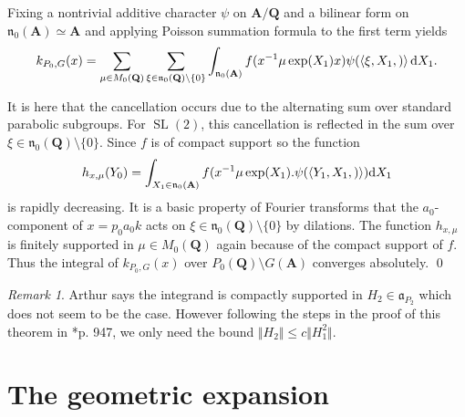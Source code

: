 \documentclass[11pt]{amsart}
\def\A{\mathbf A}
\def\Q{\mathbf Q}
\def\aaa{\mathfrak a}
\def\d{\text d}
\def\bs{\setminus}
\def\norm#1{\Vert #1 \Vert} %
\def\nnn{\mathfrak n}
\def\sl{\operatorname{SL}}
\def\sprod#1#2{\left\langle #1 , #2 \right\rangle}  %
\theoremstyle{remark}
\newtheorem{remark}[theorem]{Remark}
\begin{document}
Fixing a nontrivial additive character $\psi$ on $\A/\Q$ and a bilinear form on $\nnn_0(\A) \simeq \A$ and applying Poisson summation formula to the first term yields
\[ k_{P_0, G}(x) = \sum_{\mu \in M_0(\Q)} \sum_{\xi \in \nnn_0(\Q) \bs \{0 \}} \int_{\nnn_0(\A)}
		f(x^{-1} \mu \exp(X_1) x) \psi(\sprod{\xi, X_1}) \d X_1.
\]

It is here that the cancellation occurs due to the alternating sum over standard parabolic subgroups. For $\sl(2)$, this cancellation is reflected in the sum over $\xi \in \nnn_0(\Q) \bs \{0\}$. Since $f$ is of compact support so the function
\[ h_{x, \mu}(Y_0) = \int_{X_1 \in \nnn_0(\A)} f(x^{-1} \mu \exp(X_1) . \psi(\sprod{Y_1, X_1})) \d X_1 \]
is rapidly decreasing. It is a basic property of Fourier transforms that the $a_0$-component of $x = p_0 a_0 k$ acts on $\xi \in \nnn_0(\Q) \bs \{0\}$ by dilations. The function $h_{x, \mu}$ is finitely supported in $\mu \in M_0(\Q)$ again because of the compact support of $f$. Thus the integral of $k_{P_0, G}(x)$ over $P_0(\Q)\bs G(\A)$ converges absolutely. \qed

\begin{remark}
	Arthur says the integrand is compactly supported in $H_2 \in \aaa_{P_2}$ which does not seem to be the case. However following the steps in the proof of this theorem in \cite{duke}*{p. 947}, we only need the bound $\norm{H_2} \leq c \norm{H_1^2}$. 
\end{remark}

\section{The geometric expansion} \label{sec:geom}
\end{document}
